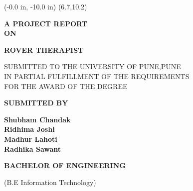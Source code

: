 \documentclass[12pt,a4paper]{article}
\begin{document}
\pagestyle{empty}
\newpage
\pagestyle{empty}
\thisfancyput(-0.0 in, -10.0 in) {\setlength{\unitlength}{1 in}\framebox(6.7,10.2)}
 
\begin{center}
      
      \textbf{A PROJECT REPORT}\\
      \textbf{ON}
      \vspace{0.2 in}
       
			\end{center}
\vspace{0.1 in}
	\begin{center}
		\textbf{ROVER THERAPIST}\\
	\end{center}
     \vspace{0.2 in}
		\begin{center}
	    SUBMITTED TO THE UNIVERSITY OF PUNE,PUNE \\
	    IN PARTIAL FULFILLMENT OF THE REQUIREMENTS\\
	    FOR THE AWARD OF THE DEGREE 
	\end{center}
	
	\vspace{0.2 in}
	
	\begin{center}
	   \textbf{SUBMITTED BY}
	\end{center}
	\vspace{0.1 in}
	\begin{center}
	\textbf{Shubham Chandak}\\
	\textbf{Ridhima Joshi}\\	
	\textbf{Madhur Lahoti}\\
	\textbf{Radhika Sawant}\\
	\end{center}
	
	\vspace{0.2 in}
	
	\begin{center}
	   \textbf{BACHELOR OF ENGINEERING}\\
	    \begin{small}(B.E Information Technology)
\end{small}	\end{center}
\end{document}
